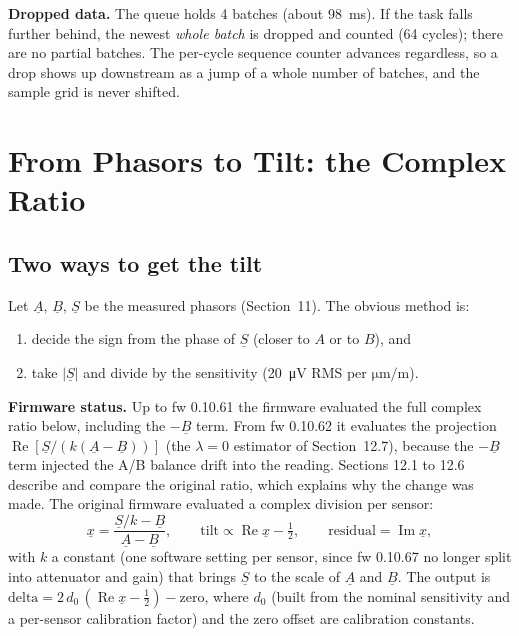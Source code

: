 \documentclass[11pt,a4paper]{article}
\begin{document}
\textbf{Dropped data.}  The queue holds 4 batches (about \SI{98}{\milli\second}).
If the task falls further behind, the newest \emph{whole batch} is dropped and
counted (64 cycles); there are no partial batches.  The per-cycle sequence
counter advances regardless, so a drop shows up downstream as a jump of a whole
number of batches, and the sample grid is never shifted.

\section{From Phasors to Tilt: the Complex Ratio}

\subsection{Two ways to get the tilt}

Let $\underline{A}$, $\underline{B}$, $\underline{S}$ be the measured
phasors (Section~11).  The obvious method is:
\begin{enumerate}
  \item decide the sign from the phase of $\underline{S}$ (closer to $A$ or
        to $B$), and
  \item take $|\underline{S}|$ and divide by the sensitivity
        (\SI{20}{\micro\volt} RMS per $\si{\micro\metre\per\metre}$).
\end{enumerate}
\textbf{Firmware status.}  Up to fw 0.10.61 the firmware evaluated the full
complex ratio below, including the $-\underline{B}$ term.  From fw 0.10.62 it
evaluates the projection $\operatorname{Re}[\underline{S}/(k(\underline{A}-\underline{B}))]$
(the $\lambda=0$ estimator of Section~12.7), because the $-\underline{B}$ term
injected the A/B balance drift into the reading.  Sections 12.1 to 12.6
describe and compare the original ratio, which explains why the change was made.
The original firmware evaluated a complex division per sensor:
\begin{equation}
  \underline{x} = \frac{\underline{S}/k - \underline{B}}{\underline{A}-\underline{B}},
  \qquad
  \text{tilt} \propto \operatorname{Re}\underline{x}-\tfrac12,
  \qquad \text{residual} = \operatorname{Im}\underline{x},
  \label{eq:ratio}
\end{equation}
with $k$ a constant (one software setting per sensor, since fw 0.10.67 no longer
split into attenuator and gain) that brings $\underline{S}$ to the scale of
$\underline{A}$ and $\underline{B}$.  The output is $\text{delta}=2\,d_0\,(\operatorname{Re}\underline{x}-\tfrac12)-\text{zero}$,
where $d_0$ (built from the nominal sensitivity and a per-sensor calibration
factor) and the zero offset are calibration constants.
\end{document}
